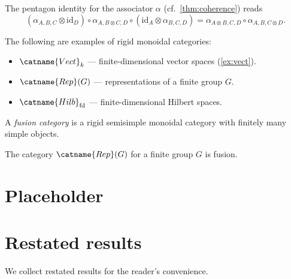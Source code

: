 \documentclass{article}
\numberwithin{equation}{section}
\begin{document}
\begin{proposition}\label{prop:endmath}
The pentagon identity for the associator $\alpha$
(cf.\ \cref{thm:coherence}) reads
\begin{equation}\label{eq:pentagon}
  (\alpha_{A,B,C} \otimes \mathrm{id}_D)
  \circ \alpha_{A,B \otimes C,D}
  \circ (\mathrm{id}_A \otimes \alpha_{B,C,D})
  = \alpha_{A \otimes B,C,D} \circ \alpha_{A,B,C \otimes D}.
\end{equation}
\end{proposition}

\begin{lemma}\label{lem:endlist}
The following are examples of rigid monoidal categories:
\begin{itemize}
  \item $\catname{Vect}_k$ — finite-dimensional vector spaces (\cref{ex:vect}).
  \item $\catname{Rep}(G)$ — representations of a finite group $G$.
  \item $\catname{Hilb}_{\mathrm{fd}}$ — finite-dimensional Hilbert spaces.
\end{itemize}
\end{lemma}

\begin{definition}\label{def:nested}
A \emph{fusion category} is a rigid semisimple monoidal category
with finitely many simple objects.
\begin{example}\label{ex:nested}
The category $\catname{Rep}(G)$ for a finite group $G$ is fusion.
\end{example}
\end{definition}

\section{Placeholder}
\label{sec:empty}

\section{Restated results}
\label{sec:restate}

We collect restated results for the reader's convenience.
\end{document}
